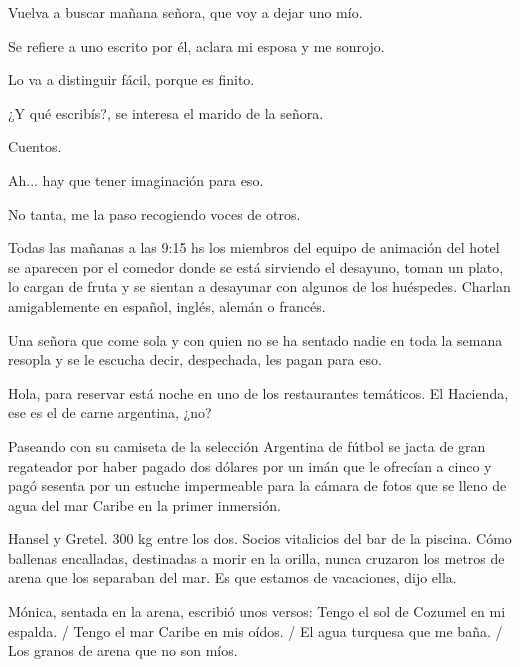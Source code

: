 \documentclass[11pt,twoside,openright,a6paper]{book}
\begin{document}
Vuelva a buscar mañana señora, que voy a dejar uno mío.

Se refiere a uno escrito por él, aclara mi esposa y me sonrojo.

Lo va a distinguir fácil, porque es finito.

¿Y qué escribís?, se interesa el marido de la señora.

Cuentos.

Ah... hay que tener imaginación para eso.

No tanta, me la paso recogiendo voces de otros.

\vspace{0.5cm}

Todas las mañanas a las 9:15 hs los miembros del equipo de animación del hotel se aparecen por el comedor donde se está sirviendo el desayuno, toman un plato, lo cargan de fruta y se sientan a desayunar con algunos de los huéspedes. Charlan amigablemente en español, inglés, alemán o francés.

Una señora que come sola y con quien no se ha sentado nadie en toda la semana resopla y se le escucha decir, despechada, les pagan para eso.

\vspace{0.5cm}

Hola, para reservar está noche en uno de los restaurantes temáticos. El Hacienda, ese es el de carne argentina, ¿no?

\vspace{0.5cm}

Paseando con su camiseta de la selección Argentina de fútbol se jacta de gran regateador por haber pagado dos dólares por un imán que le ofrecían a cinco y pagó sesenta por un estuche impermeable para la cámara de fotos que se lleno de agua del mar Caribe en la primer inmersión.

\vspace{0.5cm}

Hansel y Gretel. 300 kg entre los dos. Socios vitalicios del bar de la piscina. Cómo ballenas encalladas, destinadas a morir en la orilla, nunca cruzaron los metros de arena que los separaban del mar. Es que estamos de vacaciones, dijo ella.

\vspace{0.5cm}

Mónica, sentada en la arena, escribió unos versos: Tengo el sol de Cozumel en mi espalda. / Tengo el mar Caribe en mis oídos. / El agua turquesa que me baña. / Los granos de arena que no son míos.
\end{document}

